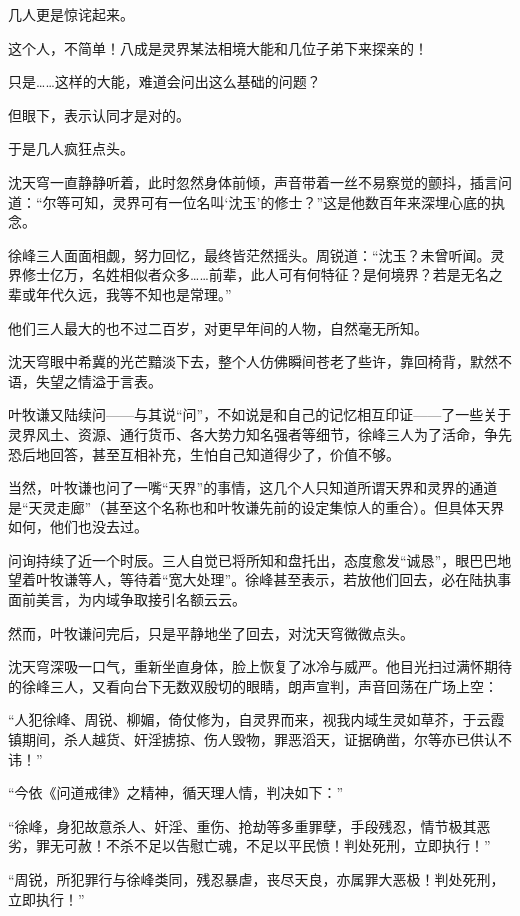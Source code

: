 几人更是惊诧起来。

这个人，不简单！八成是灵界某法相境大能和几位子弟下来探亲的！

只是……这样的大能，难道会问出这么基础的问题？

但眼下，表示认同才是对的。

于是几人疯狂点头。

沈天穹一直静静听着，此时忽然身体前倾，声音带着一丝不易察觉的颤抖，插言问道：“尔等可知，灵界可有一位名叫‘沈玉’的修士？”这是他数百年来深埋心底的执念。

徐峰三人面面相觑，努力回忆，最终皆茫然摇头。周锐道：“沈玉？未曾听闻。灵界修士亿万，名姓相似者众多……前辈，此人可有何特征？是何境界？若是无名之辈或年代久远，我等不知也是常理。”

他们三人最大的也不过二百岁，对更早年间的人物，自然毫无所知。

沈天穹眼中希冀的光芒黯淡下去，整个人仿佛瞬间苍老了些许，靠回椅背，默然不语，失望之情溢于言表。

叶牧谦又陆续问——与其说“问”，不如说是和自己的记忆相互印证——了一些关于灵界风土、资源、通行货币、各大势力知名强者等细节，徐峰三人为了活命，争先恐后地回答，甚至互相补充，生怕自己知道得少了，价值不够。

当然，叶牧谦也问了一嘴“天界”的事情，这几个人只知道所谓天界和灵界的通道是“天灵走廊”（甚至这个名称也和叶牧谦先前的设定集惊人的重合）。但具体天界如何，他们也没去过。

\vspace{2em}

问询持续了近一个时辰。三人自觉已将所知和盘托出，态度愈发“诚恳”，眼巴巴地望着叶牧谦等人，等待着“宽大处理”。徐峰甚至表示，若放他们回去，必在陆执事面前美言，为内域争取接引名额云云。

然而，叶牧谦问完后，只是平静地坐了回去，对沈天穹微微点头。

沈天穹深吸一口气，重新坐直身体，脸上恢复了冰冷与威严。他目光扫过满怀期待的徐峰三人，又看向台下无数双殷切的眼睛，朗声宣判，声音回荡在广场上空：

“人犯徐峰、周锐、柳媚，倚仗修为，自灵界而来，视我内域生灵如草芥，于云霞镇期间，杀人越货、奸淫掳掠、伤人毁物，罪恶滔天，证据确凿，尔等亦已供认不讳！”

“今依《问道戒律》之精神，循天理人情，判决如下：”

“徐峰，身犯故意杀人、奸淫、重伤、抢劫等多重罪孽，手段残忍，情节极其恶劣，罪无可赦！不杀不足以告慰亡魂，不足以平民愤！判处死刑，立即执行！”

“周锐，所犯罪行与徐峰类同，残忍暴虐，丧尽天良，亦属罪大恶极！判处死刑，立即执行！”

